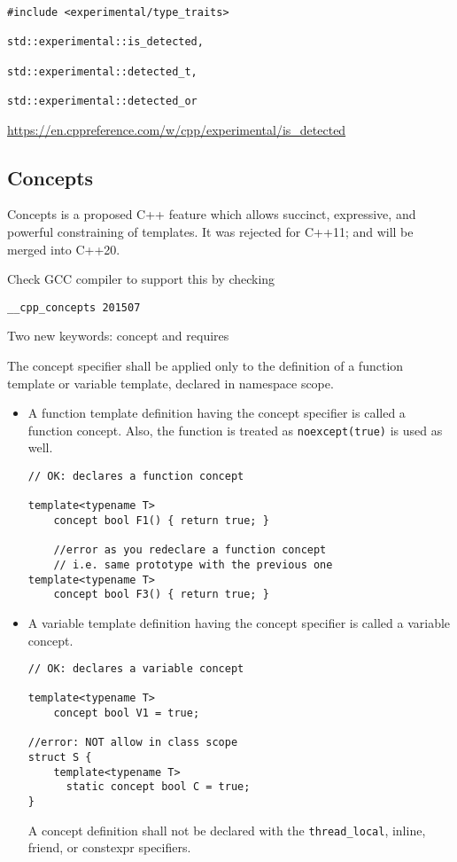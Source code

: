 \begin{verbatim}
#include <experimental/type_traits>

std::experimental::is_detected, 

std::experimental::detected_t, 

std::experimental::detected_or

\end{verbatim}
\url{https://en.cppreference.com/w/cpp/experimental/is_detected}

\subsection{Concepts}
\label{sec:concept-C++20}

Concepts is a proposed C++ feature which allows succinct, expressive, and powerful constraining of templates.
It was rejected for C++11; and will be merged into C++20. 

Check GCC compiler to support this by checking
\begin{verbatim}
__cpp_concepts 201507
\end{verbatim}

Two new keywords: concept and requires

The concept specifier shall be applied only to the definition of a function
template or variable template, declared in namespace scope.

\begin{itemize}

  \item A function template definition having the concept specifier is called a function concept.
Also, the function is treated as \verb!noexcept(true)! is used as well.

\begin{verbatim}
// OK: declares a function concept

template<typename T>
    concept bool F1() { return true; }
    
    //error as you redeclare a function concept
    // i.e. same prototype with the previous one
template<typename T>
    concept bool F3() { return true; }
\end{verbatim}


  \item   A variable template definition having the concept specifier is called a variable concept.
  
\begin{verbatim}
// OK: declares a variable concept

template<typename T>
    concept bool V1 = true;
    
//error: NOT allow in class scope
struct S {
    template<typename T>
      static concept bool C = true;
}
\end{verbatim}

A concept definition shall not be declared with the \verb!thread_local!, inline, friend, or constexpr specifiers.
\end{itemize}

